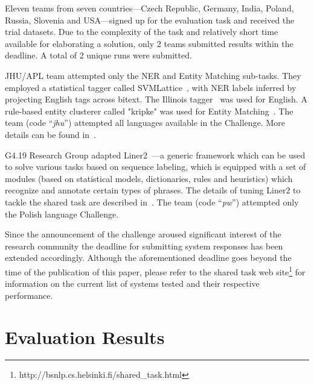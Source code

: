 \documentclass[11pt]{article}
\newcommand{\comment}[1]{}
\begin{document}
Eleven teams from seven countries---Czech Republic, Germany, India,
Poland, Russia, Slovenia and USA---signed up for the evaluation task and
received the trial datasets.  Due to the complexity of the task and
relatively short time available for elaborating a solution, only 2
teams submitted results within the deadline. A total of 2 unique runs 
were submitted.

JHU/APL team attempted only the NER and Entity Matching sub-tasks.  They
employed a statistical tagger called
SVMLattice~\cite{Mayfield:2003:LTU:956863.956921}, with NER labels
inferred by projecting English tags across bitext.  The Illinois
tagger~\cite{Ratinov:2009:DCM:1596374.1596399} was used for English. A
rule-based entity clusterer called "kripke" was used for Entity
Matching~\cite{DBLP:conf/tac/McNameeMFL13}.  
%
The team (code ``{\em jhu}'') attempted all languages available in the
Challenge. More details can be found in~\cite{mayfield:2017}.

{\sc G4.19 Research Group} adapted
Liner2~\cite{series/sci/MarcinczukKJ13}---a generic framework which can
be used to solve various tasks based on sequence labeling, which is
equipped with a set of modules (based on statistical models,
dictionaries, rules and heuristics) which recognize and annotate certain
types of phrases.  The details of tuning Liner2 to tackle the shared task
are described in~\cite{marcinczuk:2017}.
%
The team (code ``{\em pw}'') attempted only the Polish language Challenge.

\comment{
The {\sc DeepNLP} team\footnote{\tt https://github.com/tindzk/bsnlp}
learns entities and their base forms from Wikipedia data
dumps.\footnote{\tt https://dumps.wikimedia.org/} A character-level
recurrent neural network~\cite{DBLP:conf/aaai/KimJSR16} is trained to
predict which characters belong to an entity. A second neural network is
trained on inflected entities and predicts their base forms.
}

Since the announcement of the challenge aroused significant interest of 
the research community the deadline for submitting system responses
has been extended accordingly. Although the aforementioned deadline
goes beyond the time of the publication of this paper, please refer
to the shared task web site\footnote{http://bsnlp.cs.helsinki.fi/shared\_task.html}
for information on the current list of systems tested and their respective
performance. 

\section{Evaluation Results}
\label{sec:results}
\end{document}
